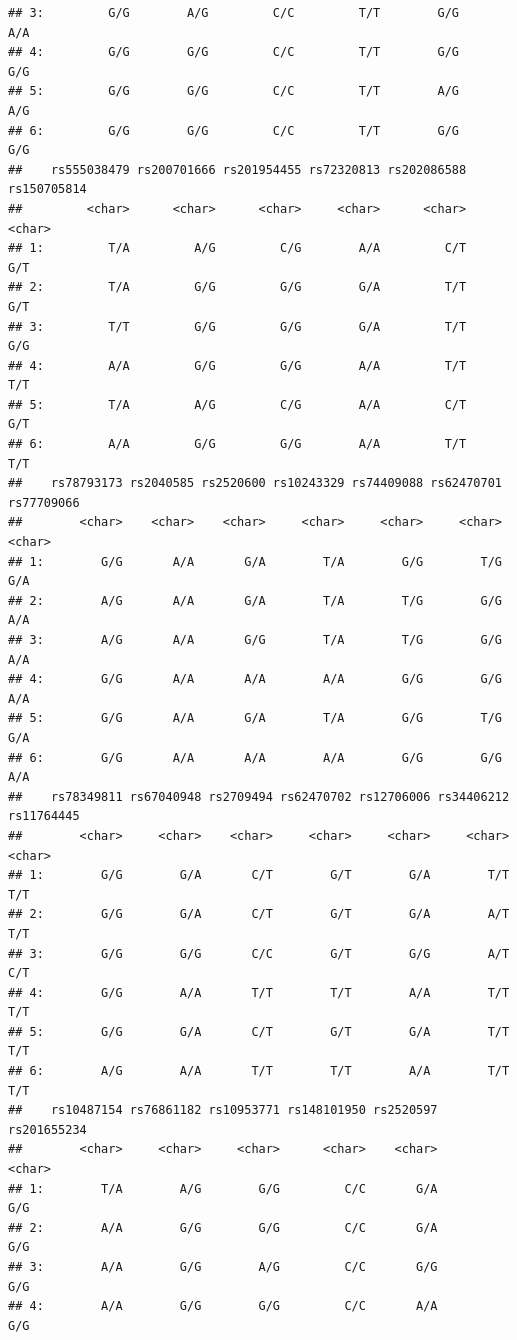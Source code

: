 \documentclass[
]{article}
\begin{document}
\begin{verbatim}
## 3:         G/G        A/G         C/C         T/T        G/G       A/A
## 4:         G/G        G/G         C/C         T/T        G/G       G/G
## 5:         G/G        G/G         C/C         T/T        A/G       A/G
## 6:         G/G        G/G         C/C         T/T        G/G       G/G
##    rs555038479 rs200701666 rs201954455 rs72320813 rs202086588 rs150705814
##         <char>      <char>      <char>     <char>      <char>      <char>
## 1:         T/A         A/G         C/G        A/A         C/T         G/T
## 2:         T/A         G/G         G/G        G/A         T/T         G/T
## 3:         T/T         G/G         G/G        G/A         T/T         G/G
## 4:         A/A         G/G         G/G        A/A         T/T         T/T
## 5:         T/A         A/G         C/G        A/A         C/T         G/T
## 6:         A/A         G/G         G/G        A/A         T/T         T/T
##    rs78793173 rs2040585 rs2520600 rs10243329 rs74409088 rs62470701 rs77709066
##        <char>    <char>    <char>     <char>     <char>     <char>     <char>
## 1:        G/G       A/A       G/A        T/A        G/G        T/G        G/A
## 2:        A/G       A/A       G/A        T/A        T/G        G/G        A/A
## 3:        A/G       A/A       G/G        T/A        T/G        G/G        A/A
## 4:        G/G       A/A       A/A        A/A        G/G        G/G        A/A
## 5:        G/G       A/A       G/A        T/A        G/G        T/G        G/A
## 6:        G/G       A/A       A/A        A/A        G/G        G/G        A/A
##    rs78349811 rs67040948 rs2709494 rs62470702 rs12706006 rs34406212 rs11764445
##        <char>     <char>    <char>     <char>     <char>     <char>     <char>
## 1:        G/G        G/A       C/T        G/T        G/A        T/T        T/T
## 2:        G/G        G/A       C/T        G/T        G/A        A/T        T/T
## 3:        G/G        G/G       C/C        G/T        G/G        A/T        C/T
## 4:        G/G        A/A       T/T        T/T        A/A        T/T        T/T
## 5:        G/G        G/A       C/T        G/T        G/A        T/T        T/T
## 6:        A/G        A/A       T/T        T/T        A/A        T/T        T/T
##    rs10487154 rs76861182 rs10953771 rs148101950 rs2520597 rs201655234
##        <char>     <char>     <char>      <char>    <char>      <char>
## 1:        T/A        A/G        G/G         C/C       G/A         G/G
## 2:        A/A        G/G        G/G         C/C       G/A         G/G
## 3:        A/A        G/G        A/G         C/C       G/G         G/G
## 4:        A/A        G/G        G/G         C/C       A/A         G/G

\end{verbatim}
\end{document}

